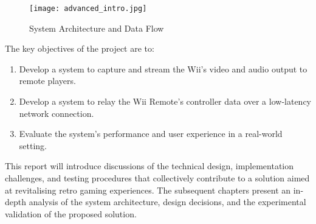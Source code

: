\begin{figure}[ht]
	\centering
	\texttt{[image: advanced\_intro.jpg]}
	\caption{System Architecture and Data Flow}
	\label{fig:expanded_overview}
\end{figure}

The key objectives of the project are to:
\begin{enumerate}
	\item  Develop a system to capture and stream the Wii’s video and audio output to remote players.
	\item Develop a system to relay the Wii Remote’s controller data over a low-latency network connection.
	\item Evaluate the system’s performance and user experience in a real-world setting.
\end{enumerate}

This report will introduce discussions of the technical design, implementation challenges, and testing procedures that collectively contribute to a solution aimed at revitalising retro gaming experiences. The subsequent chapters present an in-depth analysis of the system architecture, design decisions, and the experimental validation of the proposed solution.
